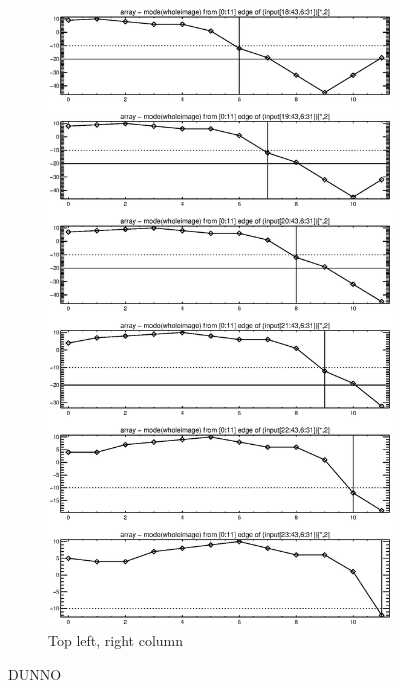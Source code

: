 \documentclass[10pt]{article}
\begin{document}
\begin{figure}[!h]
\begin{subfigure}[b]{.4\linewidth}
        \centering
        \includegraphics[width=1.4\textwidth]{../plots_tables_images/topleft1.eps} 
        \caption{Top left, right column}
    \end{subfigure}
    \caption{DUNNO}
\end{figure}
\end{document}
